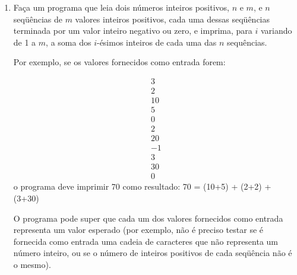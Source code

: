 \documentclass{article}
\begin{document}
\begin{enumerate}
O programa pode supor, em cada situa\c{c}\~ao de entrada de dados, que
o valor lido \'o esperado (por exemplo n\~ao \'e fornecida como
entrada nenhuma cadeia de caracteres que n\~ao representa um n\'umero
inteiro). Por exemplo, n\~ao \'e necess\'ario testar se o primeiro
valor lido (de $n$) representa de fato um valor positivo.

\item Fa\c{c}a um programa que leia dois n\'umeros inteiros positivos,
$n$ e $m$, e $n$ seq\"u\^encias de $m$ valores inteiros positivos,
cada uma dessas seq\"u\^encias terminada por um valor inteiro negativo
ou zero, e imprima, para $i$ variando de 1 a $m$, a soma dos
$i$-\'esimos inteiros de cada uma das $n$ sequ\^encias.

Por exemplo, se os valores fornecidos como entrada forem:
  
  \[ \begin{array}{l}
        3    \\
        2    \\
        10   \\
        5    \\
        0    \\
        2    \\
        20   \\
        -1   \\
        3    \\
        30   \\
        0
      \end{array} \]
o programa deve imprimir 70 como resultado: 
  70 = (10+5) + (2+2) + (3+30) 

O programa pode super que cada um dos valores fornecidos como entrada
representa um valor esperado (por exemplo, n\~ao \'e preciso testar se
\'e fornecida como entrada uma cadeia de caracteres que n\~ao
representa um n\'umero inteiro, ou se o n\'umero de inteiros positivos
de cada seq\"u\^encia n\~ao \'e o mesmo).

\end{enumerate}
\end{document}
